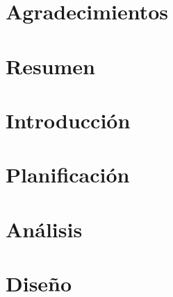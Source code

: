 \documentclass[a4paper, 11pt, showtrims]{memoir}
\title{\izenburua}
\author{\egilea}
\date{\data}
\begin{document}

% 


\cleardoublepage
\frontmatter


\chapter*{Agradecimientos}

\cleardoublepage


\chapter*{Resumen}

\cleardoublepage


\tableofcontents
\clearpage
\listoffigures
\clearpage
\listoftables
\clearpage
\listofalgorithms
{}


\cleardoublepage
\mainmatter
\pagestyle{ruled}

\chapter{Introducción} \label{ch:introduccion}

\cleardoublepage

\chapter{Planificación} \label{ch:planificacion}

\cleardoublepage

\chapter{Análisis} \label{ch:analisis}

\cleardoublepage

\chapter{Diseño} \label{ch:diseño}

\cleardoublepage
\end{document}
